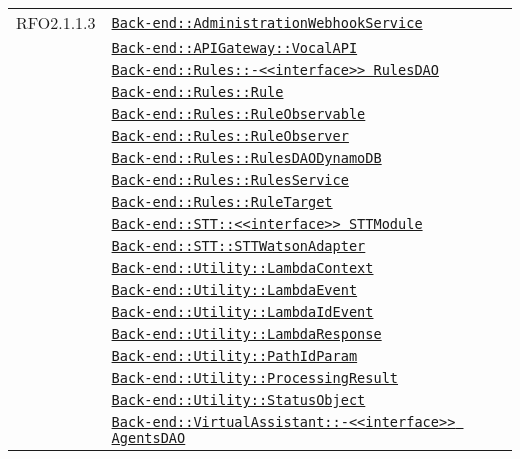 \begin{longtable}{|>{\centering}m{3cm}|m{10cm}<{\centering}|}
RFO2.1.1.3 & \hyperref[Back-end::AdministrationWebhookService]{\texttt{Back-end::AdministrationWebhookService}}\\
& \hyperref[Back-end::APIGateway::VocalAPI]{\texttt{Back-end::APIGateway::VocalAPI}}\\
& \hyperref[Back-end::Rules::<<interface>> RulesDAO]{\texttt{Back-end::Rules::-\linebreak <<interface>> RulesDAO}}\\
& \hyperref[Back-end::Rules::Rule]{\texttt{Back-end::Rules::Rule}}\\
& \hyperref[Back-end::Rules::RuleObservable]{\texttt{Back-end::Rules::RuleObservable}}\\
& \hyperref[Back-end::Rules::RuleObserver]{\texttt{Back-end::Rules::RuleObserver}}\\
& \hyperref[Back-end::Rules::RulesDAODynamoDB]{\texttt{Back-end::Rules::RulesDAODynamoDB}}\\
& \hyperref[Back-end::Rules::RulesService]{\texttt{Back-end::Rules::RulesService}}\\
& \hyperref[Back-end::Rules::RuleTarget]{\texttt{Back-end::Rules::RuleTarget}}\\
& \hyperref[Back-end::STT::<<interface>> STTModule]{\texttt{Back-end::STT::<<interface>> STTModule}}\\
& \hyperref[Back-end::STT::STTWatsonAdapter]{\texttt{Back-end::STT::STTWatsonAdapter}}\\
& \hyperref[Back-end::Utility::LambdaContext]{\texttt{Back-end::Utility::LambdaContext}}\\
& \hyperref[Back-end::Utility::LambdaEvent]{\texttt{Back-end::Utility::LambdaEvent}}\\
& \hyperref[Back-end::Utility::LambdaIdEvent]{\texttt{Back-end::Utility::LambdaIdEvent}}\\
& \hyperref[Back-end::Utility::LambdaResponse]{\texttt{Back-end::Utility::LambdaResponse}}\\
& \hyperref[Back-end::Utility::PathIdParam]{\texttt{Back-end::Utility::PathIdParam}}\\
& \hyperref[Back-end::Utility::ProcessingResult]{\texttt{Back-end::Utility::ProcessingResult}}\\
& \hyperref[Back-end::Utility::StatusObject]{\texttt{Back-end::Utility::StatusObject}}\\
& \hyperref[Back-end::VirtualAssistant::<<interface>> AgentsDAO]{\texttt{Back-end::VirtualAssistant::-\linebreak <<interface>> AgentsDAO}}\\

\end{longtable}
